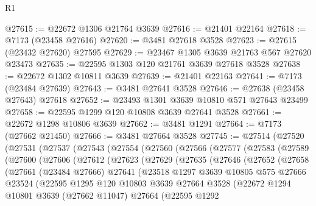 \begin{lexlean}{R1}
\begin{coremodule}
@27615 := @22672 @1306 @21764 @3639
@27616 := @21401 @22164
@27618 := @7173 (@23458 @27616)
@27620 := @3481 @27618 @3528
@27623 := @27615 (@23432 @27620) @27595
@27629 := @23467 @1305 @3639 @21763 @567 @27620 @23473
@27635 := @22595 @1303 @120 @21761 @3639 @27618 @3528
@27638 := @22672 @1302 @10811 @3639
@27639 := @21401 @22163
@27641 := @7173 (@23484 @27639)
@27643 := @3481 @27641 @3528
@27646 := @27638 (@23458 @27643) @27618
@27652 := @23493 @1301 @3639 @10810 @571 @27643 @23499
@27658 := @22595 @1299 @120 @10808 @3639 @27641 @3528
@27661 := @22672 @1298 @10806 @3639
@27662 := @3481 @1291
@27664 := @7173 (@27662 @21450)
@27666 := @3481 @27664 @3528
@27745 := @27514
    (@27520
      (@27531
        (@27537
          (@27543
            (@27554
              (@27560
                (@27566
                  (@27577
                    (@27583
                      (@27589
                        (@27600
                          (@27606
                            (@27612
                              (@27623
                                (@27629
                                  (@27635
                                    (@27646
                                      (@27652
                                        (@27658
                                          (@27661
                                            (@23484 @27666)
                                            @27641
                                            (@23518
                                              @1297
                                              @3639
                                              @10805
                                              @575
                                              @27666
                                              @23524
                                              (@22595
                                                @1295
                                                @120
                                                @10803
                                                @3639
                                                @27664
                                                @3528
                                                (@22672
                                                  @1294
                                                  @10801
                                                  @3639
                                                  (@27662 @11047)
                                                  @27664
                                                  (@22595
                                                    @1292

\end{coremodule}
\end{lexlean}
